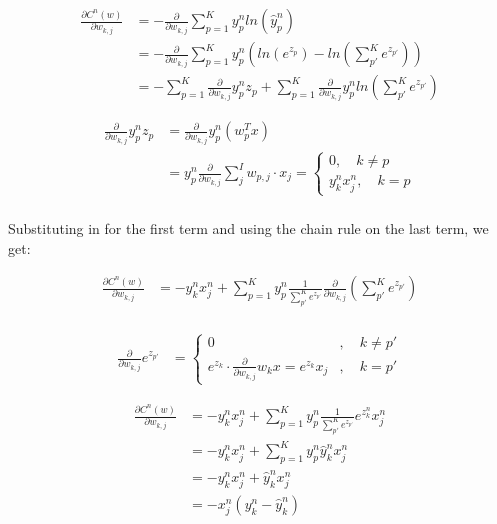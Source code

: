\begin{align*}
    \frac{\partial C^n(w)}{\partial w_{k,j}} &= -\frac{\partial}{\partial w_{k,j}} \sum_{p=1}^K y_p^n ln(\hat{y}_p^n) \\
    &= -\frac{\partial}{\partial w_{k,j}} \sum_{p=1}^K y_p^n \left( ln(e^{z_p}) - ln(\sum_{p'}^K e^{z_{p'}})\right) \\
    &= - \sum_{p=1}^K \frac{\partial}{\partial w_{k,j}} y_p^n z_p + \sum_{p=1}^K \frac{\partial}{\partial w_{k,j}} y_p^n ln \left(\sum_{p'}^K e^{z_{p'}}\right)
\end{align*}

\begin{align*}
    \frac{\partial}{\partial w_{k,j}} y_p^n z_p &= \frac{\partial}{\partial w_{k,j}} y_p^n \left( w_p^T x \right) \\
    & = y_p^n \frac{\partial}{\partial w_{k,j}} \sum_j^I w_{p,j} \cdot x_j = \begin{cases}
        0, \quad k \neq p \\
        y_k^n x_j^n, \quad k = p
    \end{cases}\\
\end{align*}

Substituting in for the first term and using the chain rule on the last term, we get:

\begin{align*}
    \frac{\partial C^n(w)}{\partial w_{k,j}} &= -y_k^n x_j^n + \sum_{p=1}^K y_p^n \frac{1}{\sum_{p'}^K e^{z_{p'}}} \frac{\partial}{\partial w_{k,j}}\left(\sum_{p'}^K e^{z_{p'}}\right) \\
\end{align*}

\begin{align*}
    \frac{\partial}{\partial w_{k,j}} e^{z_{p'}} &= \begin{cases}
            0 &, \quad k \neq p' \\
            e^{z_k} \cdot \frac{\partial}{\partial w_{k,j}} w_k x = e^{z_k} x_j &, \quad k = p'
    \end{cases}
\end{align*}

\begin{align*}
    \frac{\partial C^n(w)}{\partial w_{k,j}} &= -y_k^n x_j^n + \sum_{p=1}^K y_p^n \frac{1}{\sum_{p'}^K e^{z_{p'}}} e^{z_k^n} x_j^n\\
    &= -y_k^n x_j^n + \sum_{p=1}^K y_p^n \hat{y}_k^n x_j^n \\
    &= -y_k^n x_j^n + \hat{y}_k^n x_j^n \\
    &= -x_j^n(y_k^n - \hat{y}_k^n)
\end{align*}